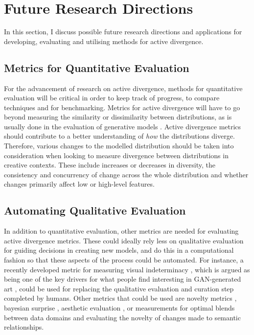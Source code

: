 \section{Future Research Directions}
\label{c6:sec:future}

In this section, I discuss possible future research directions and applications for developing, evaluating and utilising methods for active divergence.

\subsection{Metrics for Quantitative Evaluation}

For the advancement of research on active divergence, methods for quantitative evaluation will be critical in order to keep track of progress, to compare techniques and for benchmarking. 
Metrics for active divergence will have to go beyond measuring the similarity or dissimilarity between distributions, as is usually done in the evaluation of generative models \citep{gretton2019interpretable}. 
Active divergence metrics should contribute to a better understanding of \textit{how} the distributions diverge. 
Therefore, various changes to the modelled distribution should be taken into consideration when looking to measure divergence between distributions in creative contexts. These include increases or decreases in diversity, the consistency and concurrency of change across the whole distribution and whether changes primarily affect low or high-level features.

\subsection{Automating Qualitative Evaluation}

In addition to quantitative evaluation, other metrics are needed for evaluating active divergence metrics. 
These could ideally rely less on qualitative evaluation for guiding decisions in creating new models, and do this in a computational fashion so that these aspects of the process could be automated.
For instance, a recently developed metric for measuring visual indeterminacy \citep{wang2020towards}, which is argued as being one of the key drivers for what people find interesting in GAN-generated art \citep{hertzmann2020visual}, could be used for replacing the qualitative evaluation and curation step completed by humans. 
Other metrics that could be used are novelty metrics \citep{grace2019expectation}, bayesian surprise \citep{itti2009bayesian}, aesthetic evaluation \citep{galanter2012computational}, or measurements for optimal blends between data domains and evaluating the novelty of changes made to semantic relationships.


